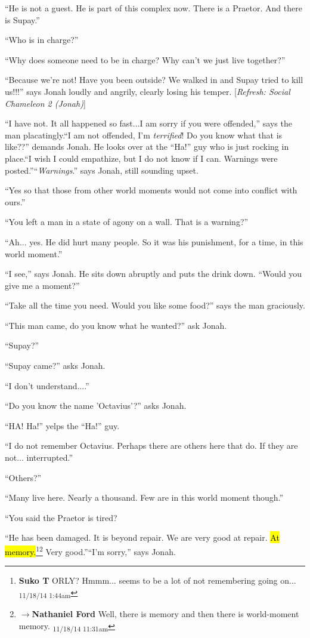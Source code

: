 ``He is not a guest.  He is part of this complex now.  There is a Praetor.  And there is Supay.''

``Who is in charge?''

``Why does someone need to be in charge?  Why can't we just live together?''

``Because we're not!  Have you been outside? We walked in and Supay tried to kill us!!!'' says Jonah loudly and angrily, clearly losing his temper. {[}\textit{Refresh: Social Chameleon 2 (Jonah)}{]}

``I have not. It all happened so fast...I am sorry if you were offended,'' says the man placatingly.``I am not offended, I'm \textit{terrified}!  Do you know what that is like??'' demands Jonah.  He looks over at the ``Ha!'' guy who is just rocking in place.``I wish I could empathize, but I do not know if I can. Warnings were posted.''``\textit{Warnings}.'' says Jonah, still sounding upset.

``Yes so that those from other world moments would not come into conflict with ours.''

``You left a man in a state of agony on a wall.  That is a warning?''

``Ah... yes.  He did hurt many people.  So it was his punishment, for a time, in this world moment.''

``I see,'' says Jonah.  He sits down abruptly and puts the drink down.  ``Would you give me a moment?''

``Take all the time you need.  Would you like some food?'' says the man graciously.

``This man came, do you know what he wanted?'' ask Jonah.

``Supay?''

``Supay came?'' asks Jonah.

``I don't understand....''

``Do you know the name 'Octavius'?'' asks Jonah.

``HA!  Ha!'' yelps the ``Ha!'' guy.

``I do not remember Octavius. Perhaps there are others here that do.  If they are not... interrupted.''

``Others?''

``Many live here.  Nearly a thousand.  Few are in this world moment though.''

``You said the Praetor is tired?

``He has been damaged.  It is beyond repair.  We are very good at repair.  \hl{At memory.}\footnote{\textbf{Suko T }ORLY?  Hmmm... seems to be a lot of not remembering going on... \textsubscript{11/18/14 1:44am}}\footnote{$\rightarrow$\textbf{Nathaniel Ford} Well, there is memory and then there is world-moment memory. \textsubscript{11/18/14 11:31am}}  Very good.''``I'm sorry,'' says Jonah.

